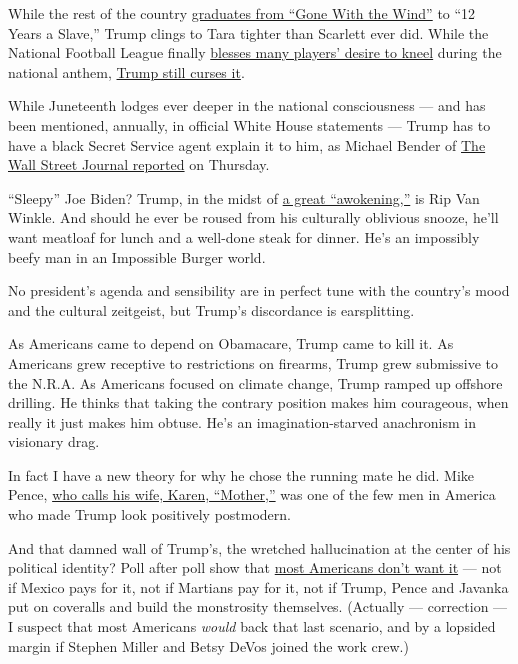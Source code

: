 While the rest of the country
\href{https://www.usatoday.com/story/entertainment/movies/2020/06/14/gone-wind-hbo-max-introduction-jacqueline-stewart/3188959001/}{graduates
from ``Gone With the Wind''} to ``12 Years a Slave,'' Trump clings to
Tara tighter than Scarlett ever did. While the National Football League
finally
\href{https://www.npr.org/sections/live-updates-protests-for-racial-justice/2020/06/05/871290906/nfl-on-kneeling-players-protests-we-were-wrong-commissioner-says}{blesses
many players' desire to kneel} during the national anthem,
\href{https://www.nytimes.com/2020/06/17/sports/football/trump-kaepernick-kneeling-anthem.html}{Trump
still curses it}.

While Juneteenth lodges ever deeper in the national consciousness ---
and has been mentioned, annually, in official White House statements ---
Trump has to have a black Secret Service agent explain it to him, as
Michael Bender of
\href{https://www.wsj.com/articles/trump-talks-juneteenth-john-bolton-economy-in-wsj-interview-11592493771}{The
Wall Street Journal reported} on Thursday.

``Sleepy'' Joe Biden? Trump, in the midst of
\href{https://www.vox.com/2019/3/22/18259865/great-awokening-white-liberals-race-polling-trump-2020}{a
great ``awokening,''} is Rip Van Winkle. And should he ever be roused
from his culturally oblivious snooze, he'll want meatloaf for lunch and
a well-done steak for dinner. He's an impossibly beefy man in an
Impossible Burger world.

No president's agenda and sensibility are in perfect tune with the
country's mood and the cultural zeitgeist, but Trump's discordance is
earsplitting.

As Americans came to depend on Obamacare, Trump came to kill it. As
Americans grew receptive to restrictions on firearms, Trump grew
submissive to the N.R.A. As Americans focused on climate change, Trump
ramped up offshore drilling. He thinks that taking the contrary position
makes him courageous, when really it just makes him obtuse. He's an
imagination-starved anachronism in visionary drag.

In fact I have a new theory for why he chose the running mate he did.
Mike Pence,
\href{https://www.politifact.com/article/2018/mar/27/does-mike-pence-call-his-wife-mother/}{who
calls his wife, Karen, ``Mother,''} was one of the few men in America
who made Trump look positively postmodern.

And that damned wall of Trump's, the wretched hallucination at the
center of his political identity? Poll after poll show that
\href{https://www.monmouth.edu/polling-institute/documents/monmouthpoll_us_042519.pdf/}{most
Americans don't want it} --- not if Mexico pays for it, not if Martians
pay for it, not if Trump, Pence and Javanka put on coveralls and build
the monstrosity themselves. (Actually --- correction --- I suspect that
most Americans \emph{would} back that last scenario, and by a lopsided
margin if Stephen Miller and Betsy DeVos joined the work crew.)


